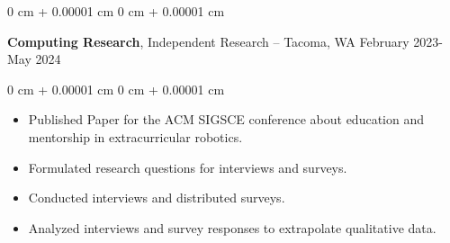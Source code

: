 \documentclass[10pt, letterpaper]{article}
\newenvironment{highlights}{
    \begin{itemize}[
        topsep=0.10 cm,
        parsep=0.10 cm,
        partopsep=0pt,
        itemsep=0pt,
        leftmargin=0 cm + 10pt
    ]
}{
    \end{itemize}
} %
\newenvironment{onecolentry}{
    \begin{adjustwidth}{
        0 cm + 0.00001 cm
    }{
        0 cm + 0.00001 cm
    }
}{
    \end{adjustwidth}
} %
\newenvironment{twocolentry}[2][]{
    \onecolentry
    \def\secondColumn{#2}
    \setcolumnwidth{\fill, 4.5 cm}
    \begin{paracol}{2}
}{
    \switchcolumn \raggedleft \secondColumn
    \end{paracol}
    \endonecolentry
} %
\begin{document}
        \vspace{0.2 cm}

        \begin{twocolentry}{
            February 2023- May 2024
        }
            \textbf{Computing Research}, Independent Research -- Tacoma, WA\end{twocolentry}

        \vspace{0.20 cm}
        \begin{onecolentry}
            \begin{highlights}
              \item Published Paper for the ACM SIGSCE conference about education and mentorship in extracurricular robotics.
              \item Formulated research questions for interviews and surveys.
              \item Conducted interviews and distributed surveys.
              \item Analyzed interviews and survey responses to extrapolate qualitative data.
            \end{highlights}
        \end{onecolentry}
        \vspace{0.2 cm}
\end{document}
